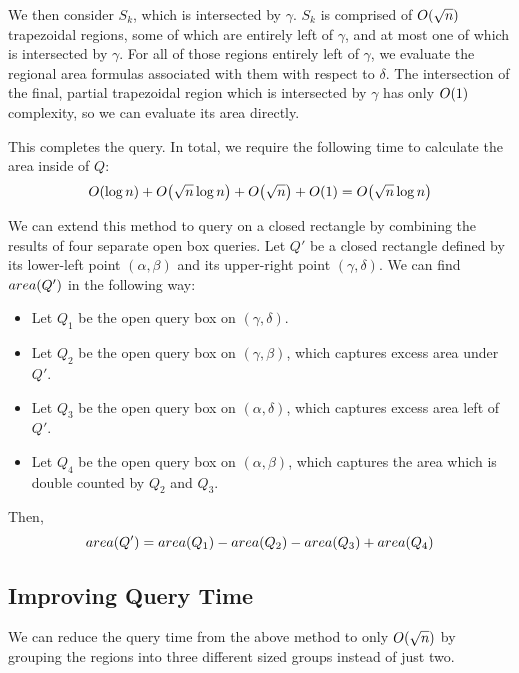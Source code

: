 We then consider $S_k$, which is intersected by $\gamma$.  
$S_k$ is comprised of $O\!\left(\sqrt{n}\right)$ trapezoidal regions, some of which are entirely left of $\gamma$, and at most one of which is intersected by $\gamma$. 
For all of those regions entirely left of $\gamma$, we evaluate the regional area formulas associated with them with respect to $\delta$. 
The intersection of the final, partial trapezoidal region which is intersected by $\gamma$ has only $O\!\left(1\right)$ complexity, so we can evaluate its area directly.

This completes the query. In total, we require the following time to calculate the area inside of $Q$:
\[ 
O\!\left(\log{n}\right) + O\!\left(\sqrt{n}\log{n}\right) + O\!\left(\sqrt{n}\right) + O\!\left(1\right) = O\!\left(\sqrt{n}\log{n}\right)
\]

\noindent We can extend this method to query on a closed rectangle by combining the results of four separate open box queries.
Let $Q'$ be a closed rectangle defined by its lower-left point $(\alpha, \beta)$ and its upper-right point $(\gamma, \delta)$.
We can find $area(Q')$ in the following way:

\begin{itemize}
\item Let $Q_1$ be the open query box on $(\gamma, \delta)$.
\item Let $Q_2$ be the open query box on $(\gamma, \beta)$, which captures excess area under $Q'$.
\item Let $Q_3$ be the open query box on $(\alpha, \delta)$, which captures excess area left of $Q'$.
\item Let $Q_4$ be the open query box on $(\alpha, \beta)$, which captures the area which is double counted by $Q_2$ and $Q_3$.
\end{itemize}

\noindent Then,
\[
area(Q') = area(Q_1) - area(Q_2) - area(Q_3) + area(Q_4)
\]

\subsection{Improving Query Time}
\label{:mono2:bitfaster}

We can reduce the query time from the above method to only $O\!\left(\sqrt{n}\right)$ by grouping the regions into three different sized groups instead of just two.

